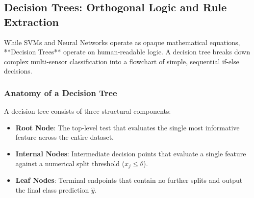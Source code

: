 \subsection{Decision Trees: Orthogonal Logic and Rule Extraction}\label{subsec:decision_trees}

While SVMs and Neural Networks operate as opaque mathematical equations, **Decision Trees** operate on human-readable logic. A decision tree breaks down complex multi-sensor classification into a flowchart of simple, sequential if-else decisions.

\subsubsection{Anatomy of a Decision Tree}
A decision tree consists of three structural components:
\begin{itemize}
    \item \textbf{Root Node}: The top-level test that evaluates the single most informative feature across the entire dataset.
    \item \textbf{Internal Nodes}: Intermediate decision points that evaluate a single feature against a numerical split threshold ($x_j \le \theta$).
    \item \textbf{Leaf Nodes}: Terminal endpoints that contain no further splits and output the final class prediction $\hat{y}$.
\end{itemize}

